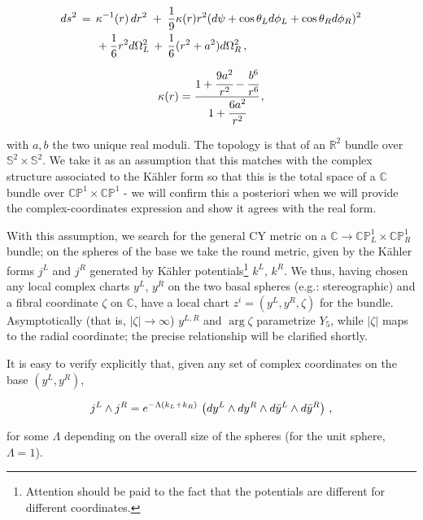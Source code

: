 \begin{align}
\begin{split}
ds^2 \,= \;\, &\kappa^{-1}(r)\,dr^2 \;+\; \frac{1}{9} \kappa(r) r^2 \large(d\psi + \cos\theta_L d\phi_L + \cos\theta_R d\phi_R\large)^2\\
& + \frac{1}{6} r^2 d\Omega_L^2 \,+ \, \frac{1}{6}(r^2+a^2) d\Omega_R^2\,, \label{y20metric} 
\end{split}
\end{align}

\begin{equation}
	\kappa(r) = \cfrac{1 + \cfrac{9a^2}{r^2} - \cfrac{b^6}{r^6}}{1+ \cfrac{6a^2}{r^2}}\,,
\end{equation}

with $a,b$ the two unique real moduli. The topology is that of an $\mathbb{R}^2$ bundle over $\mathbb{S}^2 \times \mathbb{S}^2$. We take it as an assumption that this matches with the complex structure associated to the K\"ahler form so that this is the total space of a $\mathbb{C}$ bundle over $\mathbb{CP}^1 \times \mathbb{CP}^1$ - we will confirm this a posteriori when we will provide the complex-coordinates expression and show it agrees with the real form.

With this assumption, we search for the general CY metric on a $\mathbb{C} \rightarrow \mathbb{CP}_L^1 \times \mathbb{CP}_R^1$ bundle; on the spheres of the base we take the round metric, given by the K\"ahler forms $j^L$ and $j^R$ generated by K\"ahler potentials\footnote{Attention should be paid to the fact that the potentials are different for different coordinates.} $k^L$, $k^R$. We thus, having chosen any local complex charts $y^L$, $y^R$ on the two basal spheres (e.g.: stereographic) and a fibral coordinate $\zeta$ on $\mathbb{C}$, have a local chart $z^i = (y^L,y^R,\zeta)$ for the bundle. Asymptotically (that is, $|\zeta| \rightarrow \infty$) $y^{L,R}$ and $\operatorname{arg} \zeta$ parametrize $Y_5$, while $|\zeta|$ maps to the radial coordinate; the precise relationship will be clarified shortly.

It is easy to verify explicitly that, given any set of complex coordinates on the base $(y^L,y^R)$,

\begin{equation}\label{spheresareEinstein}
	j^L \wedge j^R = e^{-\Lambda(k_L + k_R)}\, \left(dy^L \wedge dy^R \wedge d\bar y^L \wedge d\bar y^R\right)\,,
\end{equation}

for some $\Lambda$ depending on the overall size of the spheres (for the unit sphere, $\Lambda = 1$).


